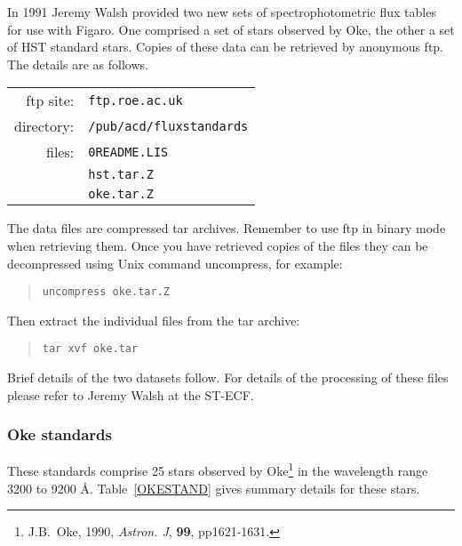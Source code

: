    In 1991 Jeremy Walsh provided two new sets of spectrophotometric flux
   tables for use with Figaro.  One comprised a set of stars observed by
   Oke, the other a set of HST standard stars.  Copies of these data can
   be retrieved by anonymous ftp.  The details are as follows.

\begin{center}
\begin{tabular}{rl}
ftp site:  & {\tt ftp.roe.ac.uk} \\
directory: & {\tt  /pub/acd/fluxstandards} \\
files:     & {\tt  0README.LIS}  \\
           & {\tt  hst.tar.Z}    \\
           & {\tt  oke.tar.Z}    \\
\end{tabular}
\end{center}

   The data files are compressed tar archives.  Remember to use ftp in
   binary mode when retrieving them.  Once you have retrieved copies of
   the files they can be decompressed using Unix command uncompress, for
   example:

\begin{quote}
{\tt uncompress oke.tar.Z}
\end{quote}

   Then extract the individual files from the tar archive:

\begin{quote}
{\tt tar xvf oke.tar}
\end{quote}

   Brief details of the two datasets follow.  For details of the processing
   of these files please refer to Jeremy Walsh at the ST-ECF.

\subsubsection{Oke standards}

   These standards comprise 25 stars observed by Oke\footnote{J.B.~Oke,
   1990, {\it Astron. J}, {\bf 99}, pp1621-1631.} in the wavelength range
   3200 to 9200 \AA .  Table~\ref{OKESTAND} gives summary details for these
   stars.


